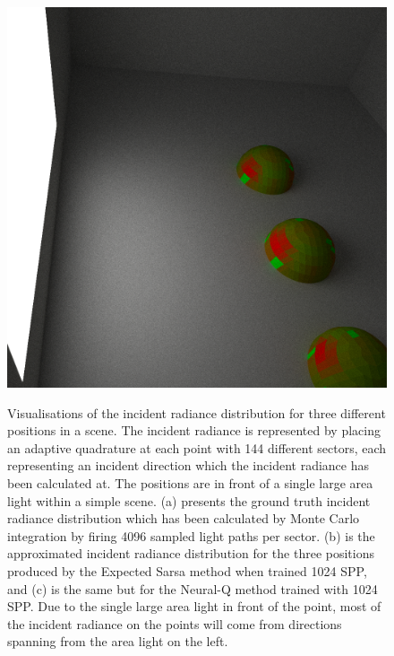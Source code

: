 \documentclass[../dissertation.tex]{subfiles}
\begin{document}
\begin{figure}[h]
  \label{fig:exp_sarsa_distribution}
\endminipage\hspace{1em}
  \includegraphics[width=\textwidth]{images/renders/neural_q_visualisation.png}
  \label{fig:neural_q_distribution}
\endminipage
\caption{Visualisations of the incident radiance distribution for three different positions in a scene. The incident radiance is represented by placing an adaptive quadrature at each point with 144 different sectors, each representing an incident direction which the incident radiance has been calculated at. The positions are in front of a single large area light within a simple scene. (a) presents the ground truth incident radiance distribution which has been calculated by Monte Carlo integration by firing 4096 sampled light paths per sector. (b) is the approximated incident radiance distribution for the three positions produced by the Expected Sarsa method when trained 1024 SPP, and (c) is the same but for the Neural-Q method trained with 1024 SPP. Due to the single large area light in front of the point, most of the incident radiance on the points will come from directions spanning from the area light on the left.}
\label{fig:distribution_visualisation}
\end{figure}
\end{document}
